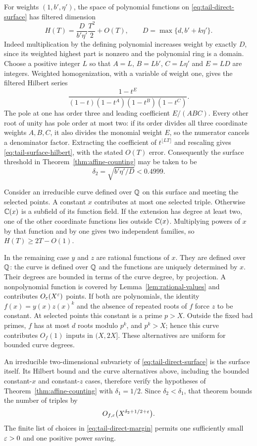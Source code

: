 For weights $(1,b',\eta')$, the space of polynomial functions on
\eqref{eq:tail-direct-surface} has filtered dimension
\begin{equation}
 H(T)=\frac{D}{b'\eta'}\frac{T^2}{2}+O(T),\qquad
 D=\max\{d,b'+k\eta'\}.
 \label{eq:tail-surface-hilbert}
\end{equation}
Indeed multiplication by the defining polynomial increases weight
by exactly $D$, since its weighted highest part is nonzero and the
polynomial ring is a domain. Choose a positive integer $L$ so that
$A=L$, $B=Lb'$, $C=L\eta'$ and $E=LD$ are integers.
Weighted homogenization, with a variable of weight one, gives
the filtered Hilbert series
\[
 \frac{1-t^E}{(1-t)(1-t^A)(1-t^B)(1-t^C)}.
\]
The pole at one has order three and leading coefficient $E/(ABC)$.
Every other root of unity has pole order at most two: if its order
divides all three coordinate weights $A,B,C$, it also divides the
monomial weight $E$, so the numerator cancels a denominator factor.
Extracting the coefficient of $t^{\lfloor LT\rfloor}$ and rescaling
gives \eqref{eq:tail-surface-hilbert}, with the stated $O(T)$ error.
Consequently the surface threshold in
Theorem~\ref{thm:affine-counting} may be taken to be
\[
 \delta_2=\sqrt{b'\eta'/D}<0.4999.
\]

Consider an irreducible curve defined over $\mathbb Q$ on this surface and
meeting the selected points. A constant $x$ contributes at most one
selected triple. Otherwise $\mathbb C(x)$ is a subfield of its function
field. If the extension has degree at least two, one of the other
coordinate functions lies outside $\mathbb C(x)$. Multiplying powers of
$x$ by that function and by one gives two independent families,
so $H(T)\ge2T-O(1)$.

In the remaining case $y$ and $z$ are rational functions of $x$.
They are defined over $\mathbb Q$: the curve is defined over $\mathbb Q$ and the
functions are uniquely determined by $x$. Their degrees are bounded
in terms of the curve degree, by projection. A nonpolynomial
function is covered by Lemma~\ref{lem:rational-values} and
contributes $O_\varepsilon(X^\varepsilon)$ points. If both are polynomials,
the identity $f(x)=y(x)z(x)^k$ and the absence of repeated roots
of $f$ force $z$ to be constant. At selected points this constant
is a prime $p>X$. Outside the fixed bad primes, $f$ has at most
$d$ roots modulo $p^k$, and $p^k>X$; hence this curve contributes
$O_f(1)$ inputs in $(X,2X]$. These alternatives are uniform for
bounded curve degrees.

An irreducible two-dimensional subvariety of
\eqref{eq:tail-direct-surface} is the surface itself. Its Hilbert bound
and the curve alternatives above, including the bounded constant-$x$
and constant-$z$ cases, therefore verify the hypotheses of
Theorem~\ref{thm:affine-counting} with $\delta_1=1/2$.
Since $\delta_2<\delta_1$, that theorem bounds the number of triples by
\[
 O_{f,\varepsilon}\bigl(X^{\delta_2+1/2+\varepsilon}\bigr).
\]
The finite list of choices in \eqref{eq:tail-direct-margin} permits
one sufficiently small $\varepsilon>0$ and one positive power saving.

